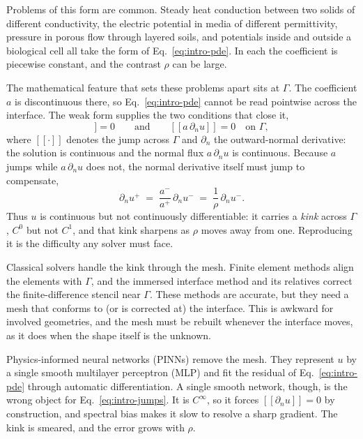 \documentclass[preprint,12pt,authoryear]{elsarticle}
\begin{document}
Problems of this form are common. Steady heat conduction between two solids of different conductivity, the electric potential in media of different permittivity, pressure in porous flow through layered soils, and potentials inside and outside a biological cell all take the form of Eq.~\eqref{eq:intro-pde}. In each the coefficient is piecewise constant, and the contrast $\rho$ can be large.

The mathematical feature that sets these problems apart sits at $\Gamma$. The coefficient $a$ is discontinuous there, so Eq.~\eqref{eq:intro-pde} cannot be read pointwise across the interface. The weak form supplies the two conditions that close it,
\begin{equation}
[\![u]\!]=0
\qquad\text{and}\qquad
[\![a\,\partial_n u]\!]=0
\quad\text{on }\Gamma,
\label{eq:intro-jumps}
\end{equation}
where $[\![\cdot]\!]$ denotes the jump across $\Gamma$ and $\partial_n$ the outward-normal derivative: the solution is continuous and the normal flux $a\,\partial_n u$ is continuous. Because $a$ jumps while $a\,\partial_n u$ does not, the normal derivative itself must jump to compensate,
\begin{equation}
\partial_n u^+ \;=\; \frac{a^-}{a^+}\,\partial_n u^- \;=\; \frac{1}{\rho}\,\partial_n u^-.
\label{eq:intro-kink}
\end{equation}
Thus $u$ is continuous but not continuously differentiable: it carries a \emph{kink} across $\Gamma$, $C^0$ but not $C^1$, and that kink sharpens as $\rho$ moves away from one. Reproducing it is the difficulty any solver must face.

Classical solvers handle the kink through the mesh. Finite element methods align the elements with $\Gamma$, and the immersed interface method and its relatives correct the finite-difference stencil near $\Gamma$. These methods are accurate, but they need a mesh that conforms to (or is corrected at) the interface. This is awkward for involved geometries, and the mesh must be rebuilt whenever the interface moves, as it does when the shape itself is the unknown.

Physics-informed neural networks (PINNs) remove the mesh. They represent $u$ by a single smooth multilayer perceptron (MLP) and fit the residual of Eq.~\eqref{eq:intro-pde} through automatic differentiation. A single smooth network, though, is the wrong object for Eq.~\eqref{eq:intro-jumps}. It is $C^\infty$, so it forces $[\![\partial_n u]\!]=0$ by construction, and spectral bias makes it slow to resolve a sharp gradient. The kink is smeared, and the error grows with $\rho$.
\end{document}
